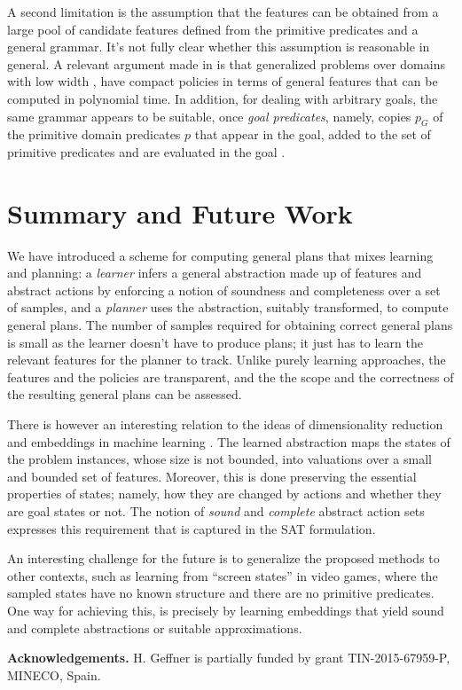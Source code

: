 \documentclass[letterpaper]{article} %
\begin{document}
A second limitation is the assumption that 
the features can be obtained from a large pool of candidate  features defined 
from the primitive predicates and a  general grammar.
It's not fully clear whether this assumption is reasonable in general.
A relevant argument made in  \cite{bonet:ijcai2018} is that generalized problems
over domains with low width \cite{nir:ecai2012}, have compact policies
in terms of general features that can be computed in polynomial time.
In addition, for dealing with arbitrary goals, the same grammar  appears
to be suitable, once  \emph{goal predicates}, namely, copies $p_G$ of the  primitive domain predicates $p$
that appear in the goal,  added to the set of primitive predicates and are evaluated in the goal
\cite{martin-geffner:generalized}. 

\section{Summary and Future Work}

We have introduced a scheme for computing general plans that mixes
learning and planning: a \emph{learner} infers a general abstraction made
up of features and abstract actions by enforcing a notion of soundness
and completeness over a  set of samples, and a \emph{planner}
uses the abstraction, suitably transformed, to compute general plans. 
The number of samples required for obtaining correct general plans is
small as the learner doesn't  have to produce plans; it just
has to learn   the relevant features for the  planner to track.
Unlike purely learning approaches, the features and the policies
are transparent, and the the scope and the correctness
of the resulting general plans can be assessed.

There is however an interesting  relation to the ideas
of dimensionality reduction and embeddings in machine learning
\cite{hamilton:embeddings}. 
The learned abstraction   maps the  states of the problem instances, 
whose size is not bounded, into valuations over a small and bounded
set of features. Moreover,  this is done preserving the   essential properties
of states; namely,  how they are changed by actions and whether they  are goal states or not.
The notion of \emph{sound} and \emph{complete} abstract action sets expresses this requirement
that is captured in the SAT formulation.

An   interesting challenge for the future  is to generalize the proposed methods  to other   contexts,   such as learning  from ``screen states''
in video games,  where the sampled  states have no known structure and  there are no primitive predicates.
One way for  achieving this, is  precisely by learning embeddings that yield sound and complete abstractions or
suitable approximations.

\medskip

\noindent \textbf{Acknowledgements.}
H. Geffner is partially funded by grant TIN-2015-67959-P, MINECO, Spain.



\end{document}
